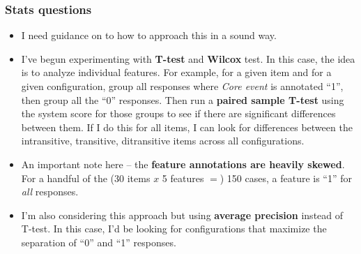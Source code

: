 \documentclass[xcolor={dvipsnames}]{beamer}
\begin{document}
\begin{frame}
\frametitle{Stats questions}
\scriptsize
\begin{itemize}
\item I need guidance on to how to approach this in a sound way.

\item I've begun experimenting with \textbf{T-test} and \textbf{Wilcox} test. In this case, the idea is to analyze individual features. For example, for a given item and for a given configuration, group all responses where \textit{Core event} is annotated ``1'', then group all the ``0'' responses. Then run a \textbf{paired sample T-test} using the system score for those groups to see if there are significant differences between them. If I do this for all items, I can look for differences between the intransitive, transitive, ditransitive items across all configurations.
\item An important note here -- the \textbf{feature annotations are heavily skewed}. For a handful of the (30 items $x$ 5 features $=$) 150 cases, a feature is ``1'' for \textit{all} responses.

\item I'm also considering this approach but using \textbf{average precision} instead of T-test. In this case, I'd be looking for configurations that maximize the separation of ``0'' and ``1'' responses.


\end{itemize}

\end{frame}
%
\end{document}
